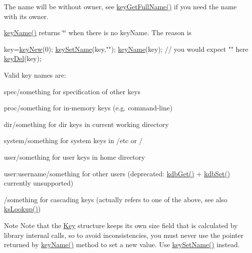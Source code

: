The name will be without owner, see \hyperlink{group__keyname_gaaba1494a5ffc976e0e56c43f4334a23c}{key\-Get\-Full\-Name()} if you need the name with its owner.

\hyperlink{group__keyname_ga8e805c726a60da921d3736cda7813513}{key\-Name()} returns \char`\"{}\char`\"{} when there is no key\-Name. The reason is 
\begin{DoxyCode}
key=\hyperlink{group__key_gad23c65b44bf48d773759e1f9a4d43b89}{keyNew}(0);
\hyperlink{group__keyname_ga7699091610e7f3f43d2949514a4b35d9}{keySetName}(key,\textcolor{stringliteral}{""});
\hyperlink{group__keyname_ga8e805c726a60da921d3736cda7813513}{keyName}(key); \textcolor{comment}{// you would expect "" here}
\hyperlink{group__key_ga3df95bbc2494e3e6703ece5639be5bb1}{keyDel}(key);
\end{DoxyCode}


Valid key names are\-: 
\begin{DoxyItemize}
\item {\ttfamily spec/something} for specification of other keys
\item {\ttfamily proc/something} for in-\/memory keys (e.\-g. command-\/line)
\item {\ttfamily dir/something} for dir keys in current working directory
\item {\ttfamily system/something} for system keys in /etc or /
\item {\ttfamily user/something} for user keys in home directory
\item {\ttfamily user\-:username/something} for other users (deprecated\-: \hyperlink{group__kdb_ga28e385fd9cb7ccfe0b2f1ed2f62453a1}{kdb\-Get()} + \hyperlink{group__kdb_ga11436b058408f83d303ca5e996832bcf}{kdb\-Set()} currently unsupported)
\item {\ttfamily /something} for cascading keys (actually refers to one of the above, see also \hyperlink{group__keyset_gaa34fc43a081e6b01e4120daa6c112004}{ks\-Lookup()}) 
\end{DoxyItemize}

\begin{DoxyNote}{Note}
Note that the \hyperlink{classkdb_1_1Key}{Key} structure keeps its own size field that is calculated by library internal calls, so to avoid inconsistencies, you must never use the pointer returned by \hyperlink{group__keyname_ga8e805c726a60da921d3736cda7813513}{key\-Name()} method to set a new value. Use \hyperlink{group__keyname_ga7699091610e7f3f43d2949514a4b35d9}{key\-Set\-Name()} instead.
\end{DoxyNote}

